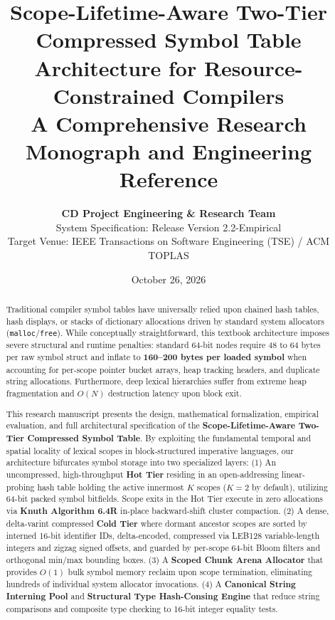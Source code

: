 \documentclass[11pt,a4paper]{article}
\title{\textbf{\LARGE Scope-Lifetime-Aware Two-Tier Compressed Symbol Table Architecture for Resource-Constrained Compilers}\\[0.5em]
\large A Comprehensive Research Monograph and Engineering Reference}
\author{\textbf{CD Project Engineering \& Research Team} \\
System Specification: Release Version 2.2-Empirical \\
Target Venue: IEEE Transactions on Software Engineering (TSE) / ACM TOPLAS}
\date{October 26, 2026}
\begin{document}
\maketitle

\begin{abstract}
Traditional compiler symbol tables have universally relied upon chained hash tables, hash displays, or stacks of dictionary allocations driven by standard system allocators (\texttt{malloc}/\texttt{free}). While conceptually straightforward, this textbook architecture imposes severe structural and runtime penalties: standard 64-bit nodes require 48 to 64 bytes per raw symbol struct and inflate to \textbf{160--200 bytes per loaded symbol} when accounting for per-scope pointer bucket arrays, heap tracking headers, and duplicate string allocations. Furthermore, deep lexical hierarchies suffer from extreme heap fragmentation and $O(N)$ destruction latency upon block exit.

This research manuscript presents the design, mathematical formalization, empirical evaluation, and full architectural specification of the \textbf{Scope-Lifetime-Aware Two-Tier Compressed Symbol Table}. By exploiting the fundamental temporal and spatial locality of lexical scopes in block-structured imperative languages, our architecture bifurcates symbol storage into two specialized layers:
(1) An uncompressed, high-throughput \textbf{Hot Tier} residing in an open-addressing linear-probing hash table holding the active innermost $K$ scopes ($K=2$ by default), utilizing 64-bit packed symbol bitfields. Scope exits in the Hot Tier execute in zero allocations via \textbf{Knuth Algorithm 6.4R} in-place backward-shift cluster compaction.
(2) A dense, delta-varint compressed \textbf{Cold Tier} where dormant ancestor scopes are sorted by interned 16-bit identifier IDs, delta-encoded, compressed via LEB128 variable-length integers and zigzag signed offsets, and guarded by per-scope 64-bit Bloom filters and orthogonal min/max bounding boxes.
(3) A \textbf{Scoped Chunk Arena Allocator} that provides $O(1)$ bulk symbol memory reclaim upon scope termination, eliminating hundreds of individual system allocator invocations.
(4) A \textbf{Canonical String Interning Pool} and \textbf{Structural Type Hash-Consing Engine} that reduce string comparisons and composite type checking to 16-bit integer equality tests.


\end{abstract}
\end{document}
